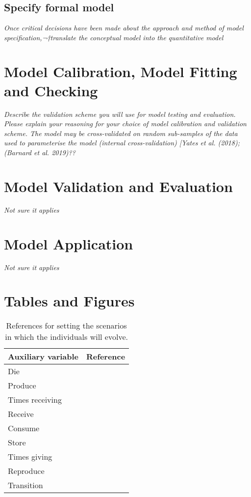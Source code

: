 \documentclass{article}
\begin{document}
\subsection{Specify formal model}

\emph{Once critical decisions have been made about the approach and method of model specification,¬†translate the conceptual model into the quantitative model}

\section{Model Calibration, Model Fitting and Checking}

\emph{Describe the validation scheme you will use for model testing and evaluation. Please explain your reasoning for your choice of model calibration and validation scheme. The model may be cross-validated on random sub-samples of the data used to parameterise the model (internal cross-validation) [Yates et al. (2018);(Barnard et al. 2019)??}

\section{Model Validation and Evaluation}

\emph{Not sure it applies}

\section{Model Application}

\emph{Not sure it applies}

\section{Tables and Figures}

\begin{table}[h!]
    \centering
    \begin{tabular}{ l r }
    \hline
    Auxiliary variable & Reference \\ 
    \hline
    Die & \cite{gurven2007longevity} \\  
    Produce & \cite{koster2020life} \\  
    Times receiving & \cite{gurven2004give} \\  
    Receive & \cite{gurven2004give} \\  
    Consume & \cite{kaplan2000theory} \\  
    Store & \cite{bowles2011cultivation} \\  
    Times giving & \cite{gurven2004give} \\  
    Reproduce & \cite{wood2017dynamics} \\  
    Transition & \cite{ellison2017reproductive,wood2017dynamics} \\
    \hline
    \end{tabular}
    \caption{References for setting the scenarios in which the individuals will evolve.}
    \label{tab:1}
\end{table}




\end{document}
